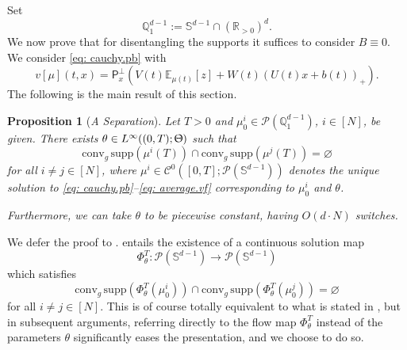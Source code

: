 \documentclass[a4paper,11pt]{article}
\theoremstyle{plain}
\newtheorem{proposition}[theorem]{Proposition}
\newcommand{\supp}{\mathrm{supp}}
\newcommand{\R}{\mathbb{R}}
\newcommand{\proj}{\bm{\mathsf{P}}^\perp}
\newcommand{\conv}{\mathrm{conv}}
\renewcommand{\S}{\mathbb{S}^{d-1}}
\newcommand{\bW}{\bm{\mathit{W}}}
\newcommand{\bV}{\bm{\mathit{V}}}
\newcommand{\bB}{\bm{\mathit{B}}}
\newcommand{\bU}{\bm{\mathit{U}}}
\newcommand{\Q}{\mathbb{Q}}
\numberwithin{equation}{section}
\begin{document}

Set 
$$\mathbb{Q}_1^{d-1}:=\S\cap (\R_{>0})^d.$$
We now prove that for disentangling the supports it suffices to consider $\bB\equiv0$. We consider \eqref{eq: cauchy.pb} with 
 \begin{equation} \label{eq: average.vf}
    v[\mu](t,x) = \proj_x\left(\bV(t)\mathbb{E}_{\mu(t)}[z]+\bW(t)(\bU(t)x+b(t))_+\right).
\end{equation}
The following is the main result of this section.

\begin{proposition}[\emph{A Separation}] \label{prop: separation}
Let $T>0$ and $\mu_0^i\in\mathscr{P}(\Q_1^{d-1})$, $i\in[N]$, be given.
There exists $\theta\in L^\infty((0,T);\Uptheta)$ such that
\begin{equation*}
    \conv_g\, \supp(\mu^i(T))\cap \conv_g \,\supp(\mu^j(T))=\varnothing
\end{equation*}
for all $i\neq j\in[N]$, where $\mu^i \in \mathscr{C}^0([0,T];\mathscr{P}(\S))$ denotes the unique solution to \eqref{eq: cauchy.pb}--\eqref{eq: average.vf} corresponding to $\mu_0^i$ and $\theta$. 

Furthermore, we can take $\theta$ to be piecewise constant, having $O(d\cdot N)$ switches.
\end{proposition}

We defer the proof to {\bf {}}.
 entails the existence of a continuous solution map 
$$\Phi^T_{\theta}:\mathscr{P}(\S)\to\mathscr{P}(\S)$$ 
which satisfies
\begin{equation*}
\conv_g\, \supp\left(\Phi^T_\theta(\mu_0^i)\right)\cap \conv_g\, \supp\left(\Phi^T_\theta(\mu_0^j)\right)=\varnothing
\end{equation*}
for all $i\neq j\in[N]$.
This is of course totally equivalent to what is stated in , but in subsequent arguments, referring directly to the flow map $\Phi^T_\theta$ instead of the parameters $\theta$ significantly eases the presentation, and we choose to do so.
\end{document}
